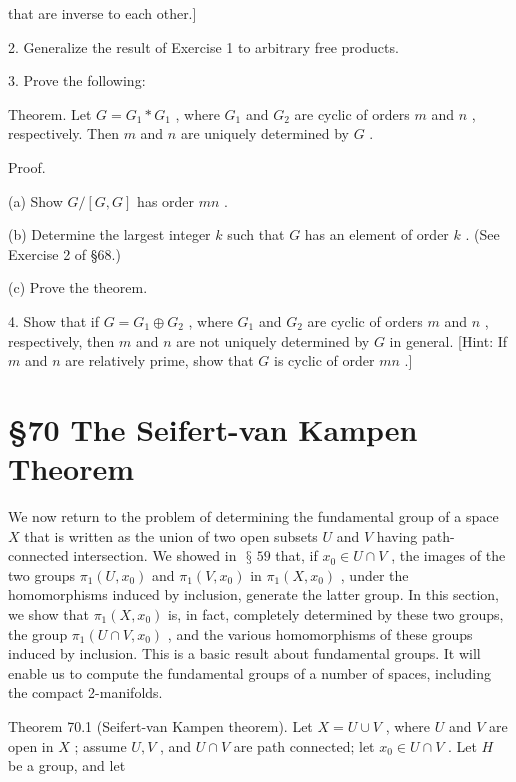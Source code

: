 \documentclass[10pt]{article}
\begin{document}
that are inverse to each other.]

2. Generalize the result of Exercise 1 to arbitrary free products.

3. Prove the following:

Theorem. Let \(G = {G}_{1} * {G}_{1}\) , where \({G}_{1}\) and \({G}_{2}\) are cyclic of orders \(m\) and \(n\) , respectively. Then \(m\) and \(n\) are uniquely determined by \(G\) .

Proof.

(a) Show \(G/\left\lbrack  {G,G}\right\rbrack\) has order \({mn}\) .

(b) Determine the largest integer \(k\) such that \(G\) has an element of order \(k\) . (See Exercise 2 of §68.)

(c) Prove the theorem.

4. Show that if \(G = {G}_{1} \oplus  {G}_{2}\) , where \({G}_{1}\) and \({G}_{2}\) are cyclic of orders \(m\) and \(n\) , respectively, then \(m\) and \(n\) are not uniquely determined by \(G\) in general. [Hint: If \(m\) and \(n\) are relatively prime, show that \(G\) is cyclic of order \({mn}\) .]

\section*{§70 The Seifert-van Kampen Theorem}

We now return to the problem of determining the fundamental group of a space \(X\) that is written as the union of two open subsets \(U\) and \(V\) having path-connected intersection. We showed in \(\text{ § }{59}\) that, if \({x}_{0} \in  U \cap  V\) , the images of the two groups \({\pi }_{1}\left( {U,{x}_{0}}\right)\) and \({\pi }_{1}\left( {V,{x}_{0}}\right)\) in \({\pi }_{1}\left( {X,{x}_{0}}\right)\) , under the homomorphisms induced by inclusion, generate the latter group. In this section, we show that \({\pi }_{1}\left( {X,{x}_{0}}\right)\) is, in fact, completely determined by these two groups, the group \({\pi }_{1}\left( {U \cap  V,{x}_{0}}\right)\) , and the various homomorphisms of these groups induced by inclusion. This is a basic result about fundamental groups. It will enable us to compute the fundamental groups of a number of spaces, including the compact 2-manifolds.

Theorem 70.1 (Seifert-van Kampen theorem). Let \(X = U \cup  V\) , where \(U\) and \(V\) are open in \(X\) ; assume \(U,V\) , and \(U \cap  V\) are path connected; let \({x}_{0} \in  U \cap  V\) . Let \(H\) be a group, and let
\end{document}
